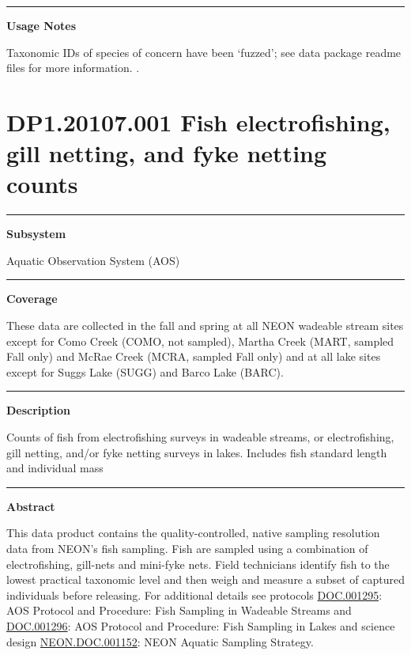 \documentclass[]{article}
\begin{document}
\begin{center}\rule{0.5\linewidth}{\linethickness}\end{center}

\textbf{Usage Notes}

Taxonomic IDs of species of concern have been `fuzzed'; see data package
readme files for more information. \newpage
.

\section{DP1.20107.001 Fish electrofishing, gill netting, and fyke
netting
counts}\label{dp1.20107.001-fish-electrofishing-gill-netting-and-fyke-netting-counts}

\begin{center}\rule{0.5\linewidth}{\linethickness}\end{center}

\textbf{Subsystem}

Aquatic Observation System (AOS)

\begin{center}\rule{0.5\linewidth}{\linethickness}\end{center}

\textbf{Coverage}

These data are collected in the fall and spring at all NEON wadeable
stream sites except for Como Creek (COMO, not sampled), Martha Creek
(MART, sampled Fall only) and McRae Creek (MCRA, sampled Fall only) and
at all lake sites except for Suggs Lake (SUGG) and Barco Lake (BARC).

\begin{center}\rule{0.5\linewidth}{\linethickness}\end{center}

\textbf{Description}

Counts of fish from electrofishing surveys in wadeable streams, or
electrofishing, gill netting, and/or fyke netting surveys in lakes.
Includes fish standard length and individual mass

\begin{center}\rule{0.5\linewidth}{\linethickness}\end{center}

\textbf{Abstract}

This data product contains the quality-controlled, native sampling
resolution data from NEON's fish sampling. Fish are sampled using a
combination of electrofishing, gill-nets and mini-fyke nets. Field
technicians identify fish to the lowest practical taxonomic level and
then weigh and measure a subset of captured individuals before
releasing. For additional details see protocols
\href{http://data.neonscience.org/api/v0/documents/NEON.DOC.001295vD}{DOC.001295}:
AOS Protocol and Procedure: Fish Sampling in Wadeable Streams and
\href{http://data.neonscience.org/api/v0/documents/NEON.DOC.001296vD}{DOC.001296}:
AOS Protocol and Procedure: Fish Sampling in Lakes and science design
\href{http://data.neonscience.org/api/v0/documents/NEON.DOC.001152vA}{NEON.DOC.001152}:
NEON Aquatic Sampling Strategy.
\end{document}
